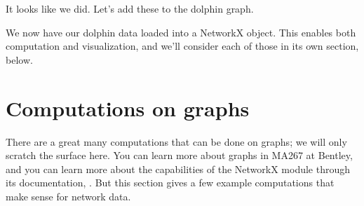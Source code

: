 \documentclass[letterpaper,10pt,english]{jupyterBook}
\begin{document}
\begin{sphinxVerbatim}[commandchars=\\\{\}]
         
\PYG{p}{[}\PYG{p}{]}                                     
\end{sphinxVerbatim}

\begin{sphinxVerbatim}
\end{sphinxVerbatim}

\sphinxAtStartPar
It looks like we did.  Let’s add these to the dolphin graph.

\begin{sphinxVerbatim}[commandchars=\\\{\}]
  
\end{sphinxVerbatim}

\sphinxAtStartPar
We now have our dolphin data loaded into a NetworkX  object.  This enables both computation and visualization, and we’ll consider each of those in its own section, below.


\section{Computations on graphs}
\label{\detokenize{chapter-15-networks:computations-on-graphs}}
\sphinxAtStartPar
There are a great many computations that can be done on graphs; we will only scratch the surface here.  You can learn more about graphs in MA267 at Bentley, and you can learn more about the capabilities of the NetworkX module through its documentation, .  But this section gives a few example computations that make sense for network data.
\end{document}
